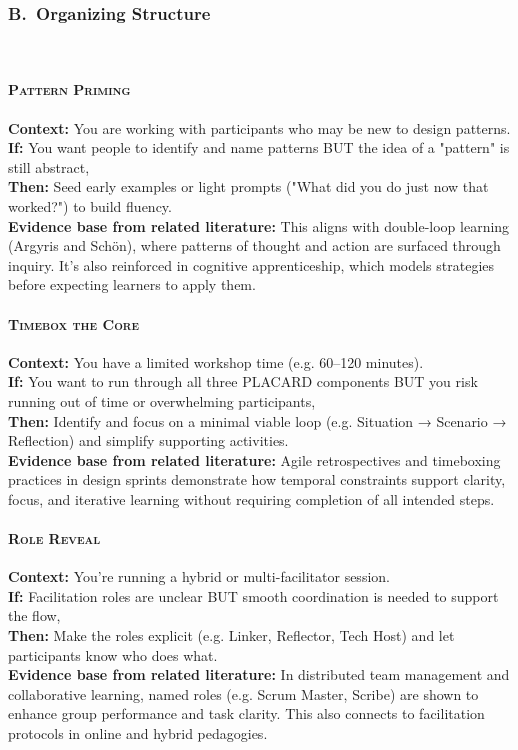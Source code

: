 \documentclass[acmlarge,timestamp]{acmart}
\begin{document}
\subsubsection*{B.~Organizing Structure}
~\newline

\paragraph*{{\scshape Pattern Priming}}

\noindent \textbf{Context:} You are working with participants who may be new to design patterns.\\
\textbf{If:} You want people to identify and name patterns BUT the idea of a "pattern" is still abstract,\\
\textbf{Then:} Seed early examples or light prompts ("What did you do just now that worked?") to build fluency.\\
\textbf{Evidence base from related literature:} This aligns with double-loop learning (Argyris and Schön), where patterns of thought and action are surfaced through inquiry. It's also reinforced in cognitive apprenticeship, which models strategies before expecting learners to apply them.

\paragraph*{{\scshape Timebox the Core}}

\noindent \textbf{Context:} You have a limited workshop time (e.g. 60–120 minutes).\\
\textbf{If:} You want to run through all three PLACARD components BUT you risk running out of time or overwhelming participants,\\
\textbf{Then:} Identify and focus on a minimal viable loop (e.g. Situation → Scenario → Reflection) and simplify supporting activities.\\
\textbf{Evidence base from related literature:} Agile retrospectives and timeboxing practices in design sprints demonstrate how temporal constraints support clarity, focus, and iterative learning without requiring completion of all intended steps.

\paragraph*{{\scshape Role Reveal}}

\noindent \textbf{Context:} You’re running a hybrid or multi-facilitator session.\\
\textbf{If:} Facilitation roles are unclear BUT smooth coordination is needed to support the flow,\\
\textbf{Then:} Make the roles explicit (e.g. Linker, Reflector, Tech Host) and let participants know who does what.\\
\textbf{Evidence base from related literature:} In distributed team management and collaborative learning, named roles (e.g. Scrum Master, Scribe) are shown to enhance group performance and task clarity. This also connects to facilitation protocols in online and hybrid pedagogies.
\end{document}
